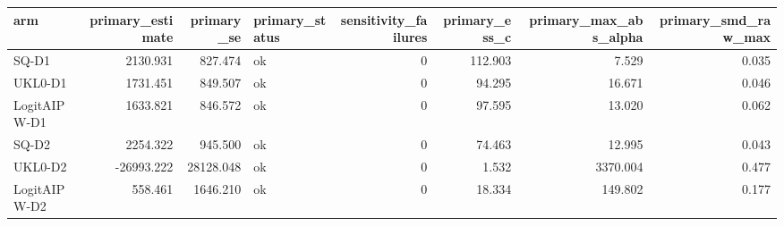 \begin{tabular}{lrrlrrrr}
\toprule
arm & primary\_estimate & primary\_se & primary\_status & sensitivity\_failures & primary\_ess\_c & primary\_max\_abs\_alpha & primary\_smd\_raw\_max \\
\midrule
SQ-D1 & 2130.931 & 827.474 & ok & 0 & 112.903 & 7.529 & 0.035 \\
UKL0-D1 & 1731.451 & 849.507 & ok & 0 & 94.295 & 16.671 & 0.046 \\
LogitAIPW-D1 & 1633.821 & 846.572 & ok & 0 & 97.595 & 13.020 & 0.062 \\
SQ-D2 & 2254.322 & 945.500 & ok & 0 & 74.463 & 12.995 & 0.043 \\
UKL0-D2 & -26993.222 & 28128.048 & ok & 0 & 1.532 & 3370.004 & 0.477 \\
LogitAIPW-D2 & 558.461 & 1646.210 & ok & 0 & 18.334 & 149.802 & 0.177 \\
\bottomrule
\end{tabular}
